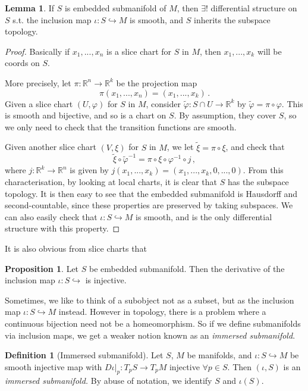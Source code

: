 \documentclass[a4paper,11pt]{article}
\theoremstyle{definition}
\newtheorem*{defn}{Definition}
\newtheorem*{prop}{Proposition}
\newtheorem*{lem}{Lemma}
\numberwithin{equation}{section}
\begin{document}
\begin{lem}
If $S$ is embedded submanifold of $M$, then $\exists!$ differential structure on $S$ s.t. the inclusion map $\iota:S\hookrightarrow M$ is smooth, and $S$ inherits the subspace topology.
\end{lem}

\begin{proof}
Basically if $x_1,...,x_n$ is a slice chart for $S$ in $M$, then $x_1,...,x_k$ will be coords on $S$.

More precisely, let $\pi:\mathbb{R}^n\rightarrow\mathbb{R}^k$ be the projection map
\[
\pi(x_1,...,x_n)=(x_1,...,x_k)\,.
\]
Given a slice chart $(U,\varphi)$ for $S$ in $M$, consider $\tilde{\varphi}:S\cap U\rightarrow\mathbb{R}^k$ by $\tilde{\varphi}=\pi\circ\varphi$. This is smooth and bijective, and so is a chart on $S$. By assumption, they cover $S$, so we only need to check that the transition functions are smooth.

Given another slice chart $(V,\xi)$ for $S$ in $M$, we let $\tilde{\xi}=\pi\circ\xi$, and check that
\[
\tilde{\xi}\circ\tilde{\varphi}^{-1}=\pi\circ\xi\circ\varphi^{-1}\circ j\,,
\]
where $j:\mathbb{R}^k\rightarrow\mathbb{R}^n$ is given by $j(x_1,...,x_k)=(x_1,...,x_k,0,...,0)$. From this characterisation, by looking at local charts, it is clear that $S$ has the subspace topology. It is then easy to see that the embedded submanifold is Hausdorff and second-countable, since these properties are preserved by taking subspaces. We can also easily check that $\iota:S\hookrightarrow M$ is smooth, and is the only differential structure with this property.
\end{proof}

It is also obvious from slice charts that
\begin{prop}
Let $S$ be embedded submanifold. Then the derivative of the inclusion map $\iota:S\hookrightarrow$ is injective.
\end{prop}

Sometimes, we like to think of a subobject not as a subset, but as the inclusion map $\iota:S\hookrightarrow M$ instead. However in topology, there is a problem where a continuous bijection need not be a homeomorphism. So if we define submanifolds via inclusion maps, we get a weaker notion known as an \emph{immersed submanifold}.

\begin{defn}[Immersed submanifold]
Let $S$, $M$ be manifolds, and $\iota:S\hookrightarrow M$ be smooth injective map with $D\iota|_p:T_pS\rightarrow T_p M$ injective $\forall p\in S$. Then $(\iota,S)$ is an \emph{immersed submanifold.} By abuse of notation, we identify $S$ and $\iota(S)$.
\end{defn}
\end{document}
